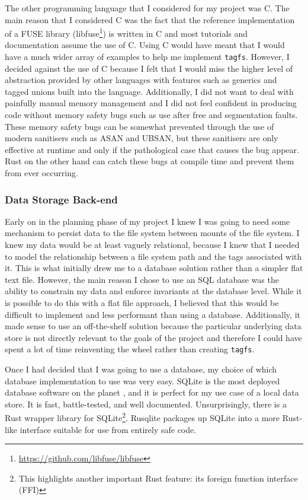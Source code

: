 The other programming language that I considered for my project was C. The main
reason that I considered C was the fact that the reference implementation of a
FUSE library (libfuse\footnote{\url{https://github.com/libfuse/libfuse}}) is
written in C and most tutorials and documentation assume the use of C. Using C
would have meant that I would have a much wider array of examples to help me
implement \texttt{tagfs}. However, I decided against the use of C because I
felt that I would miss the higher level of abstraction provided by other
languages with features such as generics and tagged unions built into the
language. Additionally, I did not want to deal with painfully manual memory
management and I did not feel confident in producing code without memory
safety bugs such as use after free and segmentation faults. These memory safety
bugs can be somewhat prevented through the use of modern sanitisers such as
ASAN and UBSAN, but these sanitisers are only effective at runtime and only if
the pathological case that causes the bug appear. Rust on the other hand can
catch these bugs at compile time and prevent them from ever occurring.


\subsubsection{Data Storage Back-end}

Early on in the planning phase of my project I knew I was going to need some
mechanism to persist data to the file system between mounts of the file system.
I knew my data would be at least vaguely relational, because I knew that I
needed to model the relationship between a file system path and the tags
associated with it. This is what initially drew me to a database solution
rather than a simpler flat text file. However, the main reason I chose to use
an SQL database was the ability to constrain my data and enforce invariants at
the database level. While it is possible to do this with a flat file approach,
I believed that this would be difficult to implement and less performant than
using a database.
Additionally, it made sense to use an off-the-shelf solution because the
particular underlying data store is not directly relevant to the goals of the
project and therefore I could have spent a lot of time reinventing the wheel
rather than creating \texttt{tagfs}.

Once I had decided that I was going to use a database, my choice of which
database implementation to use was very easy. SQLite is the most deployed
database software on the planet \cite{sqlite-most-used}, and it is perfect for
my use case of a local data store. It is fast, battle-tested, and well
documented. Unsurprisingly, there is a Rust wrapper library for
SQLite\footnote{This highlights another important Rust feature: its foreign
function interface (FFI)}. Rusqlite packages up SQLite into a more Rust-like
interface suitable for use from entirely safe code.

